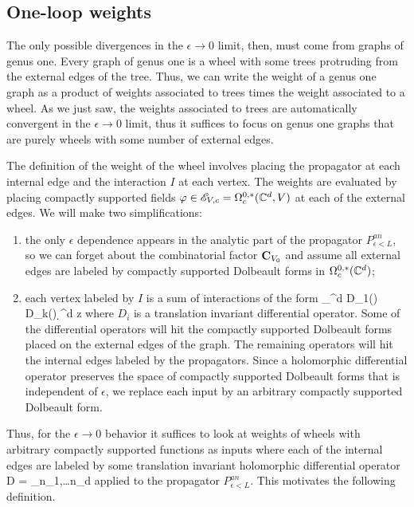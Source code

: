 \subsection{One-loop weights}

The only possible divergences in the $\epsilon \to 0$ limit, then, must come from graphs of genus one. 
Every graph of genus one is a wheel with some trees protruding from the external edges of the tree.
Thus, we can write the weight of a genus one graph as a product of weights associated to trees times the weight associated to a wheel.
As we just saw, the weights associated to trees are automatically convergent in the $\epsilon \to 0$ limit, thus it suffices to focus on genus one graphs that are purely wheels with some number of external edges.

The definition of the weight of the wheel involves placing the propagator at each internal edge and the interaction $I$ at each vertex. 
The weights are evaluated by placing compactly supported fields $\varphi \in \mathscr E_{V,c} = \Omega^{0,*}_c(\mathbb C^d, V)$ at each of the external edges.
We will make two simplifications:
\begin{enumerate}
\item the only $\epsilon$ dependence appears in the analytic part of the propagator $P_{\epsilon<L}^{an}$, so we can forget about the combinatorial factor ${\bf C}_{V_0}$ and assume all external edges are labeled by compactly supported Dolbeault forms in $\Omega^{0,*}_c(\mathbb C^d)$;
\item each vertex labeled by $I$ is a sum of interactions of the form
\ben
\int_{\CC^d} D_1(\varphi) \cdots D_k(\varphi) \d^d z
\een
where $D_i$ is a translation invariant differential operator. 
Some of the differential operators will hit the compactly supported Dolbeault forms placed on the external edges of the graph.
The remaining operators will hit the internal edges labeled by the propagators.
Since a holomorphic differential operator preserves the space of compactly supported Dolbeault forms that is independent of $\epsilon$, we replace each input by an arbitrary compactly supported Dolbeault form.
\end{enumerate}

Thus, for the $\epsilon \to 0$ behavior it suffices to look at weights of wheels with arbitrary compactly supported functions as inputs where each of the internal edges are labeled by some translation invariant holomorphic differential operator 
\ben
D = \sum_{n_1,\ldots n_d} \cdots {}
\een
applied to the propagator $P_{\epsilon<L}^{an}$.
This motivates the following definition. 


